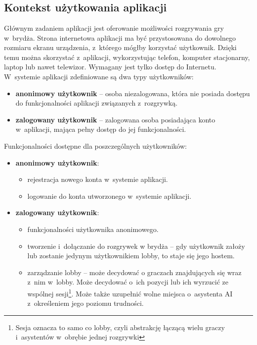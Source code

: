 \chapter{\ChapterTitleScope}
\label{sec:zakres-funkcjonalnosci}


\section{Kontekst użytkowania aplikacji}

Głównym zadaniem aplikacji jest oferowanie możliwości
rozgrywania gry w~brydża. Strona internetowa aplikacji ma być
przystosowana do dowolnego rozmiaru ekranu urządzenia, z~którego mógłby
korzystać użytkownik. Dzięki temu można skorzystać z~aplikacji, wykorzystując
telefon, komputer stacjonarny, laptop lub nawet telewizor. Wymagany
jest tylko dostęp do Internetu. \\

W~systemie aplikacji zdefiniowane są dwa typy użytkowników:
\begin{itemize}
  \item \textbf{anonimowy użytkownik} -- osoba niezalogowana, która nie
        posiada dostępu do funkcjonalności aplikacji związanych
        z~rozgrywką.

  \item \textbf{zalogowany użytkownik} -- zalogowana osoba posiadająca konto
        w~aplikacji, mająca pełny dostęp do jej funkcjonalności.
\end{itemize}

Funkcjonalności dostępne dla poszczególnych użytkowników:
\begin{itemize}
  \item \textbf{anonimowy użytkownik}:
        \begin{itemize}
          \item rejestracja nowego konta w~systemie aplikacji.
          \item logowanie do konta utworzonego w~systemie aplikacji.
        \end{itemize}

  \item \textbf{zalogowany użytkownik}:
        \begin{itemize}
          \item funkcjonalności użytkownika anonimowego.
          \item tworzenie i~dołączanie do rozgrywek w brydża --
                gdy użytkownik założy lub zostanie jedynym
                użytkownikiem lobby, to staje się jego
                hostem.
          \item zarządzanie lobby -- może decydować o graczach znajdujących się wraz
                z~nim w~lobby. Może decydować o~ich pozycji lub ich wyrzucić
                ze wspólnej sesji\footnote{Sesja oznacza to samo co lobby, czyli
                  abstrakcję łączącą wielu graczy i~asystentów w~obrębie jednej
                  rozgrywki}.
                Może także uzupełnić wolne miejsca o~asystenta AI z~określeniem jego
                poziomu trudności.
        \end{itemize}
\end{itemize}

